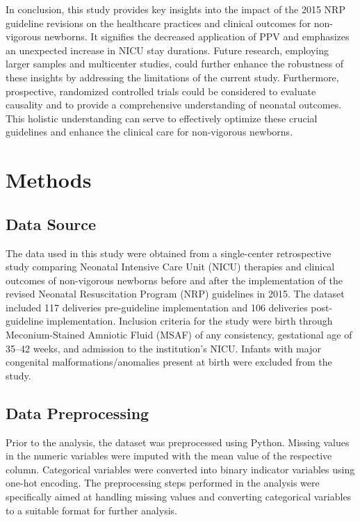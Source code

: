 \documentclass[11pt]{article}
\begin{document}
In conclusion, this study provides key insights into the impact of the 2015 NRP guideline revisions on the healthcare practices and clinical outcomes for non-vigorous newborns. It signifies the decreased application of PPV and emphasizes an unexpected increase in NICU stay durations. Future research, employing larger samples and multicenter studies, could further enhance the robustness of these insights by addressing the limitations of the current study. Furthermore, prospective, randomized controlled trials could be considered to evaluate causality and to provide a comprehensive understanding of neonatal outcomes. This holistic understanding can serve to effectively optimize these crucial guidelines and enhance the clinical care for non-vigorous newborns.

\section*{Methods}

\subsection*{Data Source}
The data used in this study were obtained from a single-center retrospective study comparing Neonatal Intensive Care Unit (NICU) therapies and clinical outcomes of non-vigorous newborns before and after the implementation of the revised Neonatal Resuscitation Program (NRP) guidelines in 2015. The dataset included 117 deliveries pre-guideline implementation and 106 deliveries post-guideline implementation. Inclusion criteria for the study were birth through Meconium-Stained Amniotic Fluid (MSAF) of any consistency, gestational age of 35–42 weeks, and admission to the institution’s NICU. Infants with major congenital malformations/anomalies present at birth were excluded from the study.

\subsection*{Data Preprocessing}
Prior to the analysis, the dataset was preprocessed using Python. Missing values in the numeric variables were imputed with the mean value of the respective column. Categorical variables were converted into binary indicator variables using one-hot encoding. The preprocessing steps performed in the analysis were specifically aimed at handling missing values and converting categorical variables to a suitable format for further analysis.
\end{document}
